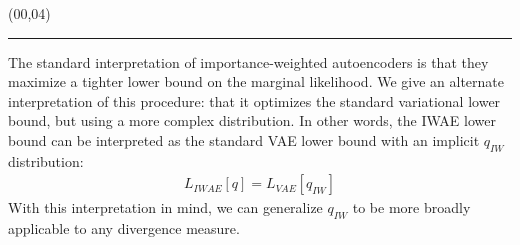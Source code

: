 \documentclass{article}
\def\CHead#1{\begin{center}\noindent{\LARGE\color{DarkBlue} #1}\end{center}}
\renewcommand{\LARGE}{\fontsize{43}{54}\selectfont}
\begin{document}
\begin{textblock}{10}(00,04)
\CHead{Main Idea} 
\hrule
\vspace{3mm}
The standard interpretation of importance-weighted autoencoders is that they maximize a tighter lower bound on the marginal likelihood.
We give an alternate interpretation of this procedure: that it optimizes the standard variational lower bound, but using a more complex distribution. In other words, the IWAE lower bound can be interpreted as the standard VAE lower bound with an implicit $q_{IW}$ distribution:
\vspace{-2mm}
\begin{align} 
L_{IWAE}[q] = L_{VAE}[q_{IW}] \nonumber
\end{align} 
With this interpretation in mind, we can generalize $q_{IW}$ to be more broadly applicable to any divergence measure.

\end{textblock}
\end{document}

